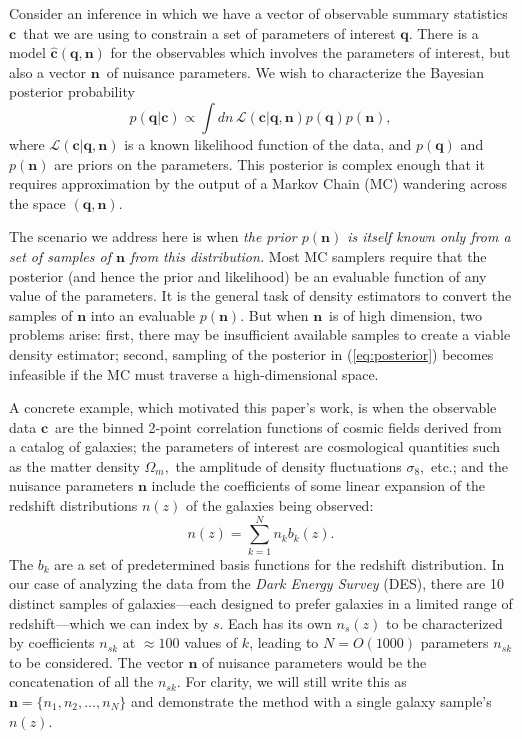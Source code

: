 \documentclass[linenumbers, onecolumn]{aastex7}
\newcommand{\vecc}{\ensuremath{\mathbf{c}}}
\newcommand{\vecq}{\ensuremath{\mathbf{q}}}
\newcommand{\vecn}{\ensuremath{\mathbf{n}}}
\newcommand{\hatc}{\ensuremath{\hat{\mathbf{c}}}}
\newcommand{\likeli}{\mathcal{L}}
\begin{document}
Consider an inference in which we have a vector of observable summary
statistics \vecc\ that we are using to constrain a set of parameters of
interest \vecq.  There is a model $\hatc(\vecq,\vecn)$ for the
observables which involves the parameters of interest, but also a
vector \vecn\ of nuisance parameters.  
We wish to characterize the Bayesian posterior probability
\begin{equation}
  p(\vecq | \vecc) \propto \int dn\, \likeli(\vecc | \vecq, \vecn) p(\vecq) p(\vecn),
\label{eq:posterior}
\end{equation}
where $\likeli(\vecc | \vecq, \vecn)$ is a known likelihood function
of the data, and $p(\vecq)$ and $p(\vecn)$ are priors on the
parameters.  This posterior is complex enough that it requires
approximation by the output of a Markov Chain (MC) wandering across the space $(\vecq,\vecn).$

The scenario we address here is when \emph{the prior $p(\vecn)$ is
  itself known only from a set of samples of $\vecn$ from this
  distribution.} Most MC samplers require that the posterior (and
hence the prior and likelihood) be an
evaluable function of any value of the parameters. It is the general task of density estimators to convert the samples of $\vecn$ into an evaluable $p(\vecn).$  But when \vecn\ is of high dimension, two problems arise: first, there may be insufficient available samples to create a viable density estimator; second, sampling of the posterior in (\ref{eq:posterior}) becomes infeasible if the MC must traverse a high-dimensional space.

A concrete example, which motivated this paper's work,
is when the observable data \vecc\ are the binned 2-point correlation functions of
cosmic fields derived from a catalog of galaxies; the parameters of
interest are cosmological quantities such as the  matter density
$\Omega_m,$ the amplitude of density fluctuations $\sigma_8,$
etc.; and the nuisance parameters $\vecn$
include the coefficients of some linear expansion of the redshift distributions $n(z)$ of the galaxies being observed:
\begin{equation}
  n(z) = \sum_{k=1}^{N} n_k b_k(z).
  \label{eq:nzbasis}
\end{equation}
The $b_k$ are a set of predetermined basis functions for the redshift
distribution.  In our case of analyzing the data from the  \textit{Dark Energy Survey} (DES), there are 10 distinct samples of galaxies---each designed to prefer galaxies in a limited range of redshift---which we can index by $s.$ Each has its own $n_s(z)$ to be characterized by coefficients $n_{sk}$ at $\approx100$ values of $k$, leading to $N=O(1000)$ parameters $n_{sk}$ to be considered.  The vector $\vecn$ of nuisance parameters would be the concatenation of all the $n_{sk}.$ For clarity, we will still write this as $\vecn=\{n_1,n_2,\ldots,n_N\}$ and demonstrate the method with a single galaxy sample's $n(z)$.
\end{document}
